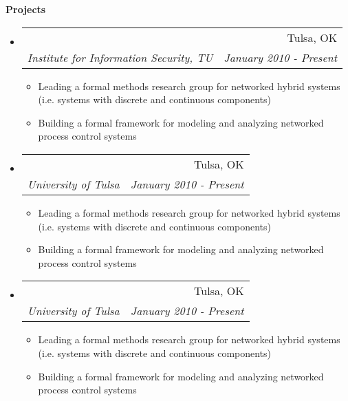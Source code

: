 \documentclass[letterpaper,11pt]{article}
\makeatletter
\newcommand{\resitem}[1]{\item #1 \vspace{-2pt}}
\newcommand{\resheading}[1]{{\large \colorbox{mygrey}{\begin{minipage}{\textwidth}{\textbf{#1 \vphantom{p\^{E}}}}\end{minipage}}}}
\newcommand{\ressubheading}[4]{
\begin{tabular*}{6.5in}{l@{\extracolsep{\fill}}r}
		\textbf{\parbox{5in}{\raggedright #1 }} & #2 \\
		\textit{#3} & \textit{#4} \\
\end{tabular*}\vspace{-6pt}}
\makeatother
\begin{document}
\resheading{Projects}
\begin{itemize}
\item
	\ressubheading{Cyber-physical Systems}{Tulsa, OK}{Institute for Information Security, TU}{January 2010 - Present}
	\begin{itemize}
		\resitem{Leading a formal methods research group for networked hybrid systems (i.e. systems with discrete and continuous components)}
		\resitem{Building a formal framework for modeling and analyzing networked process control systems}
	\end{itemize}

\item
	\ressubheading{Intrusion Detection System}{Tulsa, OK}{University of Tulsa}{January 2010 - Present}
	\begin{itemize}
		\resitem{Leading a formal methods research group for networked hybrid systems (i.e. systems with discrete and continuous components)}
		\resitem{Building a formal framework for modeling and analyzing networked process control systems}
	\end{itemize}

\item
	\ressubheading{CogTogs Risk Assessment}{Tulsa, OK}{University of Tulsa}{January 2010 - Present}
	\begin{itemize}
		\resitem{Leading a formal methods research group for networked hybrid systems (i.e. systems with discrete and continuous components)}
		\resitem{Building a formal framework for modeling and analyzing networked process control systems}
	\end{itemize}


\end{itemize}
\end{document}
